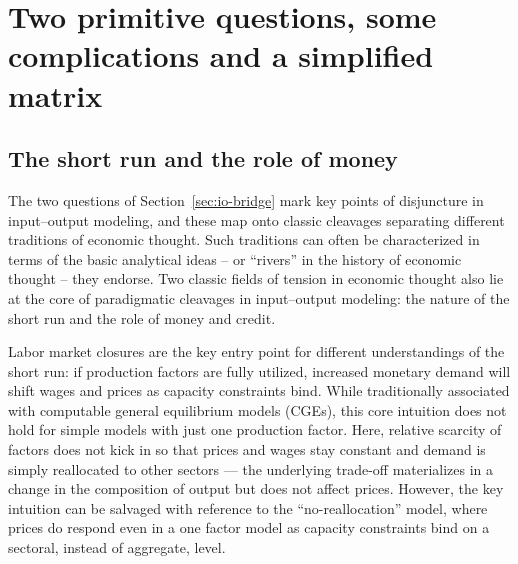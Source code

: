 \section{Two primitive questions, some complications and a simplified matrix}\label{sec:two-questions}

\subsection{The short run and the role of money}\label{subsec:questions}

The two questions of Section~\ref{sec:io-bridge} mark key points of disjuncture in input--output modeling, and these map onto classic cleavages separating different traditions of economic thought. Such traditions can often be characterized in terms of the basic analytical ideas -- or ``rivers'' in the history of economic thought \citep[][p. 9]{Screpanti2005} -- they endorse. Two classic fields of tension in economic thought also lie at the core of paradigmatic cleavages in input--output modeling: the nature of the short run and the role of money and credit.

Labor market closures are the key entry point for different understandings of the short run: if production factors are fully utilized, increased monetary demand will shift wages and prices as capacity constraints bind. While traditionally associated with computable general equilibrium models (CGEs), this core intuition does not hold for simple models with just one production factor. Here, relative scarcity of factors does not kick in so that prices and wages stay constant and demand is simply reallocated to other sectors --- the underlying trade-off materializes in a change in the composition of output but does not affect prices. However, the key intuition can be salvaged with reference to the ``no-reallocation'' model, where prices do respond even in a one factor model as capacity constraints bind on a sectoral, instead of aggregate, level.

